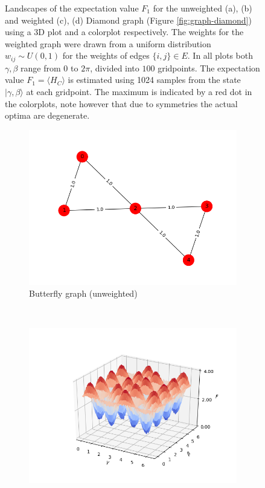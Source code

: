 \begin{figure}[H]
	\caption{Landscapes of the expectation value $F_1$ for the unweighted (a), (b) and weighted (c), (d) Diamond graph (Figure \ref{fig:graph-diamond}) using a 3D plot and a colorplot respectively. The weights for the weighted graph were drawn from a uniform distribution $w_{ij} \sim U(0,1)$ for the weights of edges $\{i,j\} \in E$. In all plots both $\gamma, \beta$ range from $0$ to $2\pi$, divided into $100$ gridpoints. The expectation value $F_1 = \langle H_C\rangle$ is estimated using 1024 samples from the state $|\gamma, \beta \rangle$ at each gridpoint. The maximum is indicated by a red dot in the colorplots, note however that due to symmetries the actual optima are degenerate.}
	\label{fig:landscapes-diamond}
\end{figure}

\newpage
\begin{figure}[H]
	\centering
	\begin{subfigure}[t]{0.6\textwidth}
		\centering
		\includegraphics[width=\textwidth]{figures/butterfly-graph.png}
		\caption{Butterfly graph (unweighted)}
	\end{subfigure}%
	\\
	\centering
	\begin{subfigure}[t]{0.5\textwidth}
		\centering
		\includegraphics[width=\textwidth]{figures/landscape_new/butterfly_3D.png}

\end{subfigure}
\end{figure}
